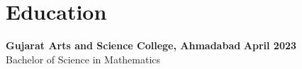 \documentclass[a4paper]{article}
\begin{document}




\section{Education}
\textbf{Gujarat Arts and Science College, Ahmadabad} \hfill  \textbf{April 2023} \\
Bachelor of Science in Mathematics
\end{document}
